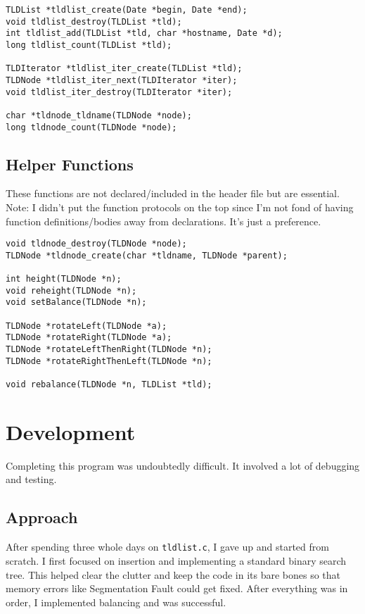 \documentclass{article}
\newcommand{\code}[1]{\texttt{#1}}
\begin{document}
\begin{verbatim}
TLDList *tldlist_create(Date *begin, Date *end);
void tldlist_destroy(TLDList *tld);
int tldlist_add(TLDList *tld, char *hostname, Date *d);
long tldlist_count(TLDList *tld);

TLDIterator *tldlist_iter_create(TLDList *tld);
TLDNode *tldlist_iter_next(TLDIterator *iter);
void tldlist_iter_destroy(TLDIterator *iter);

char *tldnode_tldname(TLDNode *node);
long tldnode_count(TLDNode *node);
\end{verbatim}

\vspace{1cm}

\subsection{Helper Functions}
These functions are not declared/included in the header file but are essential.\\
\footnotesize{Note: I didn't put the function protocols on the top since I'm not fond of having function definitions/bodies away from declarations. It's just a preference.} \normalsize

\begin{verbatim}
void tldnode_destroy(TLDNode *node);
TLDNode *tldnode_create(char *tldname, TLDNode *parent);

int height(TLDNode *n);
void reheight(TLDNode *n);
void setBalance(TLDNode *n);

TLDNode *rotateLeft(TLDNode *a);
TLDNode *rotateRight(TLDNode *a);
TLDNode *rotateLeftThenRight(TLDNode *n);
TLDNode *rotateRightThenLeft(TLDNode *n);

void rebalance(TLDNode *n, TLDList *tld);
\end{verbatim}


\newpage

\section{Development}
Completing this program was undoubtedly difficult. It involved a lot of debugging and testing.

\subsection{Approach}
After spending three whole days on \code{tldlist.c}, I gave up and started from scratch. I first focused on insertion and implementing a standard binary search tree. This helped clear the clutter and keep the code in its bare bones so that memory errors like Segmentation Fault could get fixed. After everything was in order, I implemented balancing and was successful.
\end{document}
